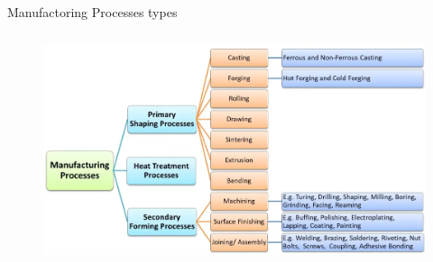 \documentclass[aspectratio=169]{beamer}
\begin{document}
\begin{frame}[t]{Manufactoring Processes types}
\framesubtitle{}
    \vspace{-0.6cm}
    \begin{figure}[H]
        \centering\includegraphics[height=6.5cm,width=1\textwidth,keepaspectratio]{fig2.png}
        \label{fig:fig2.png}
    \end{figure}
\end{frame}
\end{document}
